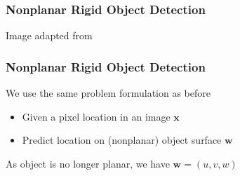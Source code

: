\documentclass[xetex,professionalfont]{beamer}
\renewcommand{\vec}[1]{\ensuremath{\mathbf{#1}}}
\newcommand{\vw}{\vec{w}}
\newcommand{\vx}{\vec{x}}
\begin{document}

{
\begin{frame}


\end{frame}
}


\begin{frame}
\frametitle{Nonplanar Rigid Object Detection}

\begin{center}
    {\centering Image adapted from \cite{lowe2004}}
\end{center}

\end{frame}


\begin{frame}
\frametitle{Nonplanar Rigid Object Detection}

We use the same problem formulation as before
\begin{itemize}
    \item Given a pixel location in an image $\vx$
    \item Predict location on (nonplanar) object surface $\vw$
\end{itemize}

\bigskip
As object is no longer planar, we have $\vw=(u,v,w)$

\end{frame}

\end{document}
